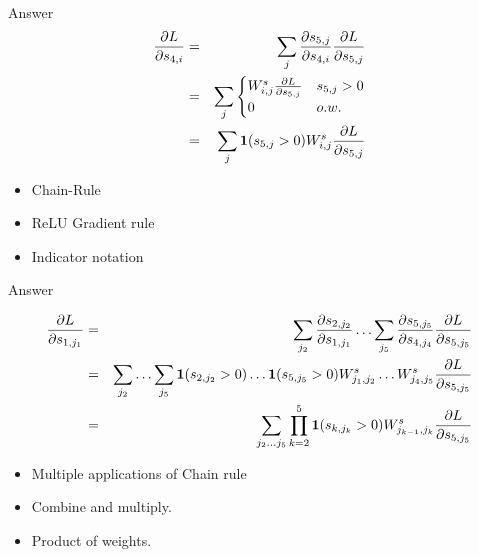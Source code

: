 \documentclass{beamer}
\begin{document}
\begin{frame}{Answer}
  \begin{eqnarray*}
    \frac{\partial L}{\partial s_{4,i} } &=& \sum_{j} \frac{\partial s_{5,j}}{\partial s_{4,i}} \frac{\partial L}{\partial s_{5,j}} \\
     &=&  \sum_{j}
      \begin{cases}
        W^s_{i,j}  \frac{\partial L}{\partial s_{5, j}} &  s_{5, j} > 0\\
        0 &  o.w.\\
      \end{cases} \\
    &=& \sum_{j} \mathbf{1}(s_{5, j} > 0) W^s_{i,j}  \frac{\partial L}{\partial s_{5, j}} 
  \end{eqnarray*}
  \begin{itemize}
  \item Chain-Rule
  \item ReLU Gradient rule
  \item Indicator notation
  \end{itemize}
\end{frame}


\begin{frame}{Answer}

  \begin{eqnarray*}
    \frac{\partial L}{\partial s_{1,j_1}} &=& \sum_{j_2} \frac{\partial s_{2,j_2}}{\partial s_{1,j_1}} \ldots \sum_{j_5} \frac{\partial s_{5,j_5}}{\partial s_{4,j_4}} \frac{\partial L}{\partial s_{5,j_5}}\\
    &=& \sum_{j_2} \ldots \sum_{j_5} \mathbf{1}(s_{2, j_2} > 0) \ldots \mathbf{1}(s_{5, j_5} > 0) W^s_{j_1,j_2} \ldots W^s_{j_4,j_5}  \frac{\partial L}{\partial s_{5, j_5}}  \\ 
    &=& \sum_{j_2 \ldots j_5} \prod_{k=2}^5 \mathbf{1}(s_{k, j_k} > 0)  W^s_{j_{k-1},j_k}  \frac{\partial L}{\partial s_{5, j_5}}  \\ 
  \end{eqnarray*}
  \begin{itemize}
  \item Multiple applications of Chain rule
  \item Combine and multiply.
  \item Product of weights.
  \end{itemize}
\end{frame}
\end{document}

